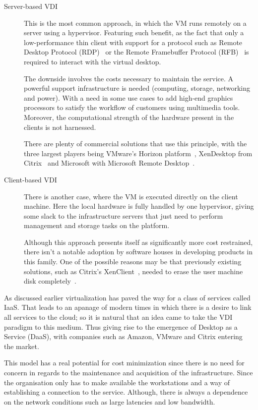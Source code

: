 \begin{description}
	\item [Server-based VDI] This is the most common approach, in which the VM runs remotely on a server using a hypervisor. Featuring such benefit, as the fact that only a low-performance thin client with support for a protocol such as Remote Desktop Protocol (RDP)~\cite{Microsoft_RDP} or the Remote Framebuffer Protocol (RFB)~\cite{rfc6143} is required to interact with the virtual desktop.

		The downside involves the costs necessary to maintain the service. A powerful support infrastructure is needed (computing, storage, networking and power). With a need in some use cases to add high-end graphics processors to satisfy the workflow of customers using multimedia tools. Moreover, the computational strength of the hardware present in the clients is not harnessed. 

		There are plenty of commercial solutions that use this principle, with the three largest players being VMware's Horizon platform~\cite{VMware_horizon}, XenDesktop from Citrix~\cite{Citrix_XenDesktop} and Microsoft with Microsoft Remote Desktop~\cite{Microsoft_RDS}.
	\newpage
	\item [Client-based VDI] There is another case, where the VM is executed directly on the client machine. Here the local hardware is fully handled by one hypervisor, giving some slack to the infrastructure servers that just need to perform management and storage tasks on the platform.

		Although this approach presents itself as significantly more cost restrained, there isn't a notable adoption by software houses in developing products in this family. One of the possible reasons may be that previously existing solutions, such as Citrix's XenClient~\cite{Citrix_XenDesktop}, needed to erase the user machine disk completely~\cite{VMblog_Citrix}.
\end{description}

As discussed earlier virtualization has paved the way for a class of services called IaaS. That leads to an apanage of modern times in which there is a desire to link all services to the cloud; so it is natural that an idea came to take the VDI paradigm to this medium. Thus giving rise to the emergence of Desktop as a Service (DaaS), with companies such as Amazon, VMware and Citrix entering the market.

This model has a real potential for cost minimization since there is no need for concern in regards to the maintenance and acquisition of the infrastructure. Since the organisation only has to make available the workstations and a way of establishing a connection to the service. Although, there is always a dependence on the network conditions such as large latencies and low bandwidth.

